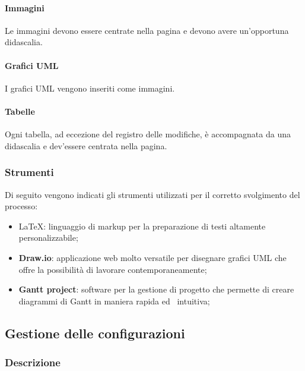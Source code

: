 \paragraph{Immagini}
\label{par:immagini}

Le immagini devono essere centrate nella pagina e devono avere un'opportuna didascalia.

\paragraph{Grafici UML}
\label{par:uml}

I grafici UML vengono inseriti come immagini.

\paragraph{Tabelle}
\label{par:tabelle}

Ogni tabella, ad eccezione del registro delle modifiche, è accompagnata da una didascalia e dev'essere centrata nella
pagina.

\subsubsection{Strumenti}
\label{ssub:strumenti}

Di seguito vengono indicati gli strumenti utilizzati per il corretto svolgimento del processo:
\begin{itemize}
	\item \LaTeX: linguaggio di markup per la preparazione di testi altamente personalizzabile;
	\item \textbf{Draw.io}: applicazione web molto versatile per disegnare grafici UML che offre la possibilità di lavorare
		contemporaneamente;
	\item \textbf{Gantt project}: software per la gestione di progetto che permette di creare diagrammi di Gantt in maniera rapida ed \
		intuitiva;
\end{itemize}

\subsection{Gestione delle configurazioni}
\label{sub:gestione_configurazioni}

\subsubsection{Descrizione}
\label{ssub:gestione_configurazione:descrizione}

